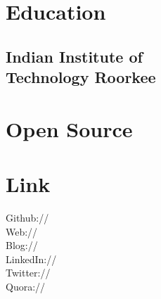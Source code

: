 \documentclass[]{deedy-resume-openfont}
\begin{document}
\begin{minipage}[t]{0.33\textwidth}


\section{Education}


\subsection{Indian Institute of \\ Technology Roorkee}
\sectionsep


\section{Open Source}
    \textbullet{} \href{https://github.com/sympy/sympy}{} \textbullet{} \href{http://mpmath.org/}{} \textbullet{} \href{https://www.libreoffice.org}{}


\section{Link}
Github:// \href{https://github.com/aktech}{} \\
Web:// \href{http://iamit.in/}{} \\
Blog:// \href{http://iamit.in/blog/}{} \\
LinkedIn://  \href{https://www.linkedin.com/in/iaktech}{} \\
Twitter://  \href{https://twitter.com/iaktech}{} \\
Quora://  \href{https://www.quora.com/Amit-Kumar-516}{}
\sectionsep


\end{minipage}
\end{document}
